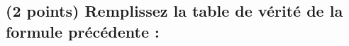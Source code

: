 \documentclass[11pt,a4paper]{article}
\begin{document}

\bigskip
\bigskip
\bigskip
\bigskip



\begin{table}[!ht]
  \centering
  \begin{minipage}{0.50\textwidth}
    \centering

\subsection{(2 points) Remplissez la table de vérité de la formule précédente : }




\end{minipage}
\end{table}
\end{document}
